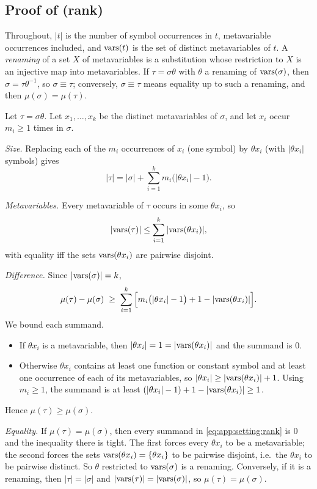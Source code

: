 \subsection{Proof of \texorpdfstring{}{the rank lemma} (rank)}

Throughout, $|t|$ is the number of symbol occurrences in $t$, metavariable
occurrences included, and $\mathrm{vars}(t)$ is the set of distinct metavariables of $t$.
A \emph{renaming} of a set $X$ of metavariables is a substitution whose
restriction to $X$ is an injective map into metavariables. If $\tau=\sigma\theta$
with $\theta$ a renaming of $\mathrm{vars}(\sigma)$, then $\sigma=\tau\theta^{-1}$, so
$\sigma\equiv\tau$; conversely, $\sigma\equiv\tau$ means equality up to such a
renaming, and then $\mu(\sigma)=\mu(\tau)$.

Let $\tau=\sigma\theta$. Let $x_1,\dots,x_k$ be the distinct metavariables of
$\sigma$, and let $x_i$ occur $m_i\ge1$ times in $\sigma$.

\emph{Size.} Replacing each of the $m_i$ occurrences of $x_i$ (one symbol) by
$\theta x_i$ (with $|\theta x_i|$ symbols) gives
\[
  |\tau|=|\sigma|+\sum_{i=1}^k m_i\big(|\theta x_i|-1\big).
\]

\emph{Metavariables.} Every metavariable of $\tau$ occurs in some $\theta x_i$, so
\[
  |\mathrm{vars}(\tau)|\le\sum_{i=1}^k|\mathrm{vars}(\theta x_i)|,
\]
with equality iff the sets $\mathrm{vars}(\theta x_i)$ are pairwise disjoint.

\emph{Difference.} Since $|\mathrm{vars}(\sigma)|=k$,
\begin{equation}\label{eq:app:setting:rank}
  \mu(\tau)-\mu(\sigma)
  \;\ge\;\sum_{i=1}^k\Big[m_i\big(|\theta x_i|-1\big)+1-|\mathrm{vars}(\theta x_i)|\Big].
\end{equation}
We bound each summand.
\begin{itemize}
\item If $\theta x_i$ is a metavariable, then $|\theta x_i|=1=|\mathrm{vars}(\theta x_i)|$
  and the summand is $0$.
\item Otherwise $\theta x_i$ contains at least one function or constant symbol and
  at least one occurrence of each of its metavariables, so
  $|\theta x_i|\ge|\mathrm{vars}(\theta x_i)|+1$. Using $m_i\ge1$, the summand is at least
  $(|\theta x_i|-1)+1-|\mathrm{vars}(\theta x_i)|\ge1$.
\end{itemize}
Hence $\mu(\tau)\ge\mu(\sigma)$.

\emph{Equality.} If $\mu(\tau)=\mu(\sigma)$, then every summand in
\eqref{eq:app:setting:rank} is $0$ and the inequality there is tight. The first
forces every $\theta x_i$ to be a metavariable; the second forces the sets
$\mathrm{vars}(\theta x_i)=\{\theta x_i\}$ to be pairwise disjoint, i.e.\ the
$\theta x_i$ to be pairwise distinct. So $\theta$ restricted to $\mathrm{vars}(\sigma)$ is
a renaming. Conversely, if it is a renaming, then $|\tau|=|\sigma|$ and
$|\mathrm{vars}(\tau)|=|\mathrm{vars}(\sigma)|$, so $\mu(\tau)=\mu(\sigma)$.

